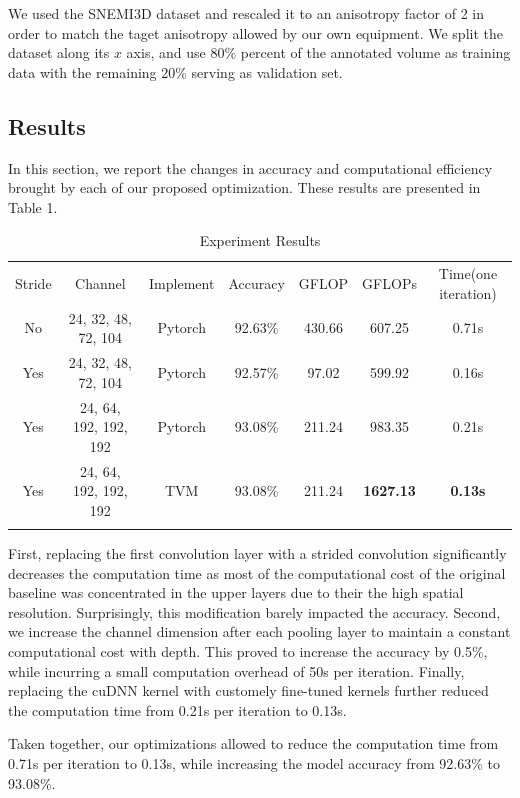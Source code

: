 \documentclass[runningheads]{llncs}
\begin{document}
We used the SNEMI3D dataset and rescaled it to an anisotropy factor of 2 in order 
to match the taget anisotropy allowed by our own equipment.
We split the dataset along its $x$ axis, and use 80\% percent of the annotated volume as training data
with the remaining 20\% serving as validation set.

\subsection{Results}

In this section, we report the changes in accuracy and computational efficiency
brought by each of our proposed optimization. 
These results are presented in Table 1.

\begin{table}
\centering
\caption{Experiment Results}
\label{tab:1}
\begin{tabular}{ccccccc}
\hline\noalign{\smallskip}
Stride & Channel & Implement & Accuracy & GFLOP & GFLOPs & Time(one iteration)  \\
\noalign{\smallskip}\hline\noalign{\smallskip}
No & 24, 32, 48, 72, 104 & Pytorch & 92.63\% &  430.66 & 607.25 & 0.71s\\
Yes & 24, 32, 48, 72, 104 & Pytorch & 92.57\% &  97.02 & 599.92 & 0.16s\\
Yes & 24, 64, 192, 192, 192 & Pytorch & 93.08\% &  211.24 & 983.35 & 0.21s\\
Yes & 24, 64, 192, 192, 192 & TVM & 93.08\% & 211.24 & \textbf{1627.13} &  \textbf{0.13s}\\
\noalign{\smallskip}\hline
\end{tabular}
\end{table}

First, replacing the first convolution layer with a strided convolution significantly decreases the computation time
as most of the computational cost of the original baseline was concentrated in the upper layers due to their the high spatial resolution.
Surprisingly, this modification barely impacted the accuracy.
Second, we increase the channel dimension after each pooling layer to maintain a constant computational cost with depth.
This proved to increase the accuracy by 0.5\%, while incurring a small computation overhead of 50s per iteration.  
Finally, replacing the cuDNN kernel with customely fine-tuned kernels further reduced the computation time from 0.21s per iteration to 0.13s.

Taken together, our optimizations allowed to reduce the computation time from 0.71s per iteration to 0.13s, 
while increasing the model accuracy from 92.63\% to 93.08\%.
\end{document}
